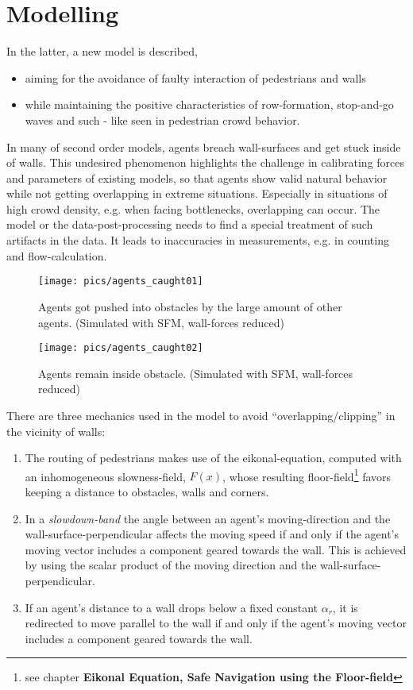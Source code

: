 \section{Modelling}

In the latter, a new model is described, 
\begin{itemize}
\item aiming for
the avoidance of faulty interaction of pedestrians and walls 
\item while
maintaining the positive characteristics of row-formation, stop-and-go
waves and such - like seen in pedestrian crowd behavior.
\end{itemize}
In many of second order models, agents breach wall-surfaces and get stuck inside of walls.
This undesired phenomenon highlights the challenge in calibrating forces and parameters of existing models, so that agents show valid natural behavior while not getting overlapping in extreme situations. Especially in situations of high crowd density, e.g. when facing bottlenecks, overlapping can occur. The model or the data-post-processing needs to find a special treatment of such artifacts in the data. It leads to inaccuracies in measurements, e.g. in counting and flow-calculation.
\begin{figure}[h!]
\texttt{[image: pics/agents\_caught01]}
\caption{Agents got pushed into obstacles by the large amount of other agents. (Simulated with SFM, wall-forces reduced)}
\end{figure}
\begin{figure}[h!]
\texttt{[image: pics/agents\_caught02]}
\caption{Agents remain inside obstacle. (Simulated with SFM, wall-forces reduced)}
\end{figure}

There are three mechanics used in the model to avoid ``overlapping/clipping'' in the vicinity of walls:
\begin{enumerate}
\item The routing of pedestrians makes use of the eikonal-equation, computed with an inhomogeneous slowness-field, $F(x)$, whose resulting floor-field\footnote{see chapter \textbf{Eikonal Equation, Safe Navigation using the Floor-field}} favors keeping a distance to obstacles, walls and corners.
\item In a \emph{slowdown-band} the angle between an agent's moving-direction and the wall-surface-perpendicular affects the moving speed if and only if the agent's moving vector includes a component geared towards the wall. This is achieved by using the scalar product of the moving direction and the wall-surface-perpendicular.
\item If an agent's distance to a wall drops below a fixed constant $\alpha_r$, it is redirected to move parallel to the wall if and only if the agent's moving vector includes a component geared towards the wall.
\end{enumerate}

